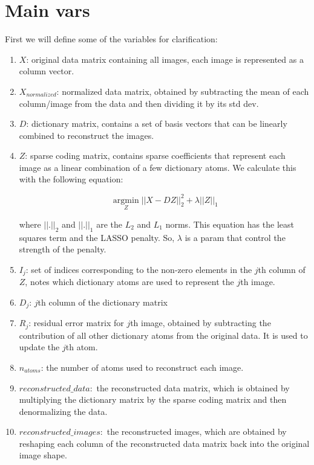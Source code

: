 \documentclass[11pt]{article}
\begin{document}
\section{Main vars}

First we will define some of the variables for clarification:
\begin{enumerate}

    \item
    $X$: original data matrix containing all images, each image is represented as a column vector.
    \item
    $X_{normalized}$: normalized data matrix, obtained by subtracting the mean of each column/image from the data and then dividing it by its std dev.
    \item
    $D$: dictionary matrix, contains a set of basis vectors that can be linearly combined to reconstruct the images. 
    \item
    $Z$: sparse coding matrix, contains sparse coefficients that represent each image as a linear combination of a few dictionary atoms. We calculate this with the following equation:

    $$\underset{Z}{\operatorname{argmin}} ||X - DZ||^2_2 + \lambda ||Z||_1$$

    where $||.||_2$ and $||.||_1$ are the $L_2$ and $L_1$ norms. This equation has the least squares term and the LASSO penalty. So, $\lambda$ is a param that control the strength of the penalty. 
    \item
    $I_j$: set of indices corresponding to the non-zero elements in the $j$th column of $Z$, notes which dictionary atoms are used to represent the $j$th image.
    \item
    $D_j$: $j$th column of the dictionary matrix
    \item
    $R_j$: residual error matrix for $j$th image, obtained by subtracting the contribution of all other dictionary atoms from the original data. It is used to update the $j$th atom.
    \item
    $n_{atoms}$: the number of atoms used to reconstruct each image.
    \item
    $reconstructed\_data:$ the reconstructed data matrix, which is obtained by multiplying the dictionary matrix by the sparse coding matrix and then denormalizing the data.
    \item
    $reconstructed\_images:$ the reconstructed images, which are obtained by reshaping each column of the reconstructed data matrix back into the original image shape.
\end{enumerate}
\end{document}
